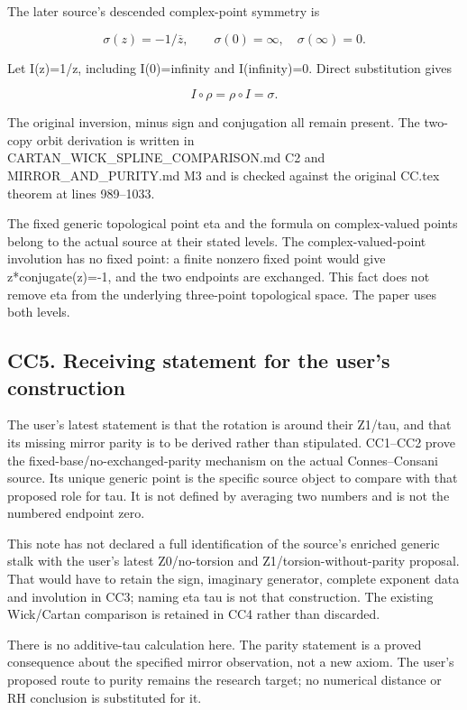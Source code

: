 \documentclass[
  11pt,
]{article}
\begin{document}
The later source's descended complex-point symmetry is

\[
\sigma(z)=-1/\overline z,
\qquad \sigma(0)=\infty,\quad\sigma(\infty)=0.
\]

Let I(z)=1/z, including I(0)=infinity and I(infinity)=0. Direct
substitution gives

\[
I\circ\rho=\rho\circ I=\sigma.
\]

The original inversion, minus sign and conjugation all remain present.
The two-copy orbit derivation is written in
CARTAN\_WICK\_SPLINE\_COMPARISON.md C2 and MIRROR\_AND\_PURITY.md M3 and
is checked against the original CC.tex theorem at lines 989--1033.

The fixed generic topological point eta and the formula on
complex-valued points belong to the actual source at their stated
levels. The complex-valued-point involution has no fixed point: a finite
nonzero fixed point would give z*conjugate(z)=-1, and the two endpoints
are exchanged. This fact does not remove eta from the underlying
three-point topological space. The paper uses both levels.

\subsection{CC5. Receiving statement for the user's
construction}\label{cc5.-receiving-statement-for-the-users-construction}

The user's latest statement is that the rotation is around their Z1/tau,
and that its missing mirror parity is to be derived rather than
stipulated. CC1--CC2 prove the fixed-base/no-exchanged-parity mechanism
on the actual Connes--Consani source. Its unique generic point is the
specific source object to compare with that proposed role for tau. It is
not defined by averaging two numbers and is not the numbered endpoint
zero.

This note has not declared a full identification of the source's
enriched generic stalk with the user's latest Z0/no-torsion and
Z1/torsion-without-parity proposal. That would have to retain the sign,
imaginary generator, complete exponent data and involution in CC3;
naming eta tau is not that construction. The existing Wick/Cartan
comparison is retained in CC4 rather than discarded.

There is no additive-tau calculation here. The parity statement is a
proved consequence about the specified mirror observation, not a new
axiom. The user's proposed route to purity remains the research target;
no numerical distance or RH conclusion is substituted for it.
\end{document}
